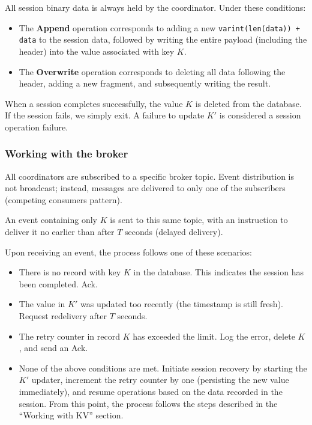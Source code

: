 \documentclass[a4paper,12pt]{article}
\begin{document}
    All session binary data is always held by the coordinator. Under these conditions:

    \begin{itemize}
        \item The \textbf{Append} operation corresponds to adding a new \texttt{varint(len(data)) + data} to the session data, followed by writing the entire payload (including the header) into the value associated with key $K$.
        \item The \textbf{Overwrite} operation corresponds to deleting all data following the header, adding a new fragment, and subsequently writing the result.
    \end{itemize}

    When a session completes successfully, the value $K$ is deleted from the database. If the session fails, we simply exit. A failure to update $K'$ is considered a session operation failure.

    \subsubsection{Working with the broker}

    All coordinators are subscribed to a specific broker topic. Event distribution is not broadcast; instead, messages are delivered to only one of the subscribers (competing consumers pattern).

    \smallskip
    An event containing only $K$ is sent to this same topic, with an instruction to deliver it no earlier than after $T$ seconds (delayed delivery).

    \smallskip
    Upon receiving an event, the process follows one of these scenarios:

    \begin{itemize}
        \item There is no record with key $K$ in the database. This indicates the session has been completed. Ack.
        \item The value in $K'$ was updated too recently (the timestamp is still fresh). Request redelivery after $T$ seconds.
        \item The retry counter in record $K$ has exceeded the limit. Log the error, delete $K$, and send an Ack.
        \item None of the above conditions are met. Initiate session recovery by starting the $K'$ updater, increment the retry counter by one (persisting the new value immediately), and resume operations based on the data recorded in the session. From this point, the process follows the steps described in the \enquote{Working with KV} section.
    \end{itemize}
\end{document}
